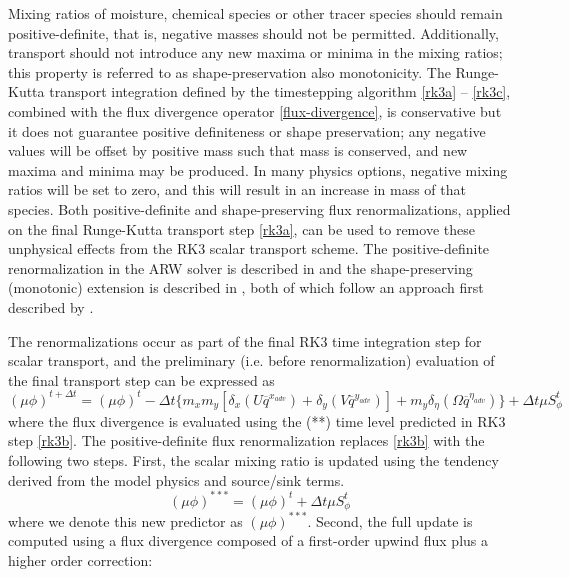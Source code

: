 Mixing ratios of moisture, chemical species or other tracer species
should remain positive-definite, that is, negative masses should not be
permitted.  Additionally, transport should not introduce any new maxima or minima 
in the mixing ratios; this property is referred to as shape-preservation also monotonicity.
The Runge-Kutta transport integration defined by the
timestepping algorithm \eqref{rk3a} -- \eqref{rk3c}, combined with the
flux divergence operator \eqref{flux-divergence}, is conservative but it
does not guarantee positive definiteness or shape preservation; any negative values will be
offset by positive mass such that mass is conserved, and new maxima and minima may be produced.  In many physics
options, negative mixing ratios will be set to zero, and this will
result in an increase in mass of that species.  Both positive-definite and shape-preserving flux
renormalizations, applied on the final Runge-Kutta transport step
\eqref{rk3a}, can be used to remove these unphysical effects from the RK3
scalar transport scheme.  The positive-definite renormalization in the ARW solver is described in 
\citet{skamarock-weisman-08} and the shape-preserving (monotonic) extension is described in \citet{Wang-et-al-2009}, 
both of which follow an approach first described by \citet{Zalesak-1979}.

The renormalizations occur as part of the final RK3 time integration step for scalar transport, and the preliminary
(i.e. before renormalization) evaluation of the final transport step can be
expressed as
%
\begin{equation}
(\mu\phi)^{t+\Delta t} = (\mu\phi)^{t} - {\Delta t}\bigl\{
m_x m_y [\delta_x (U \overline{q}^{x_{adv}}) 
+ \delta_y (V\overline{q}^{y_{adv}})] 
+ m_y \delta_\eta
(\Omega \overline{q}^{\eta_{adv}})\bigr\}
+ \Delta t \mu S_\phi^t
\label{rk3c-scalar}
\end{equation}
%
\noindent
where the flux divergence is evaluated using the (**) time level
predicted in RK3 step \eqref{rk3b}.  The positive-definite flux
renormalization replaces \eqref{rk3b} with the following two steps.  First,
the scalar mixing ratio is updated using the tendency derived from the
model physics and source/sink terms.
%
\begin{equation}
(\mu\phi)^{***} = (\mu\phi)^{t} + {\Delta t} \mu S_\phi^t
\label{scalar-source-update}
\end{equation}
%
where we denote this new predictor as $(\mu\phi)^{***}$.  Second, the
full update is computed using a
flux divergence composed of a first-order upwind flux plus a
higher order correction:

